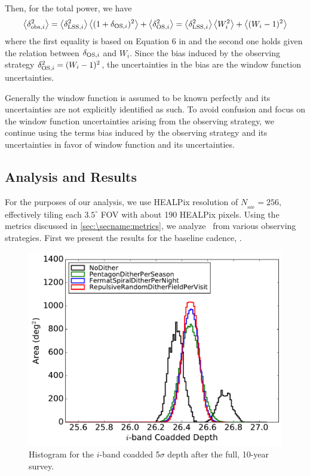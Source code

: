Then, for the total power, we have
\begin{equation}
\left < {\delta_{\mathrm{obs},i}^2} \right >=\left < {\delta_{\mathrm{LSS},i}^2} \right >\left < {(1 + \delta_{\mathrm{OS},i})^2} \right >+ \left < {\delta_{\mathrm{OS},i}^2} \right >=\left < {\delta_{\mathrm{LSS},i}^2} \right >\left < {W_i^2} \right >+ \left < {(W_i-1)^2} \right >
\end{equation}
where the first equality is based on Equation 6 in \citet{AwanEtal2016} and the second one holds given the relation between $\delta_{\mathrm{OS},i}$ and $W_i$. Since the bias induced by the observing strategy $\delta_{\mathrm{OS},i}^2=  (W_i-1)^2$, the uncertainties in the bias are the window function uncertainties.

Generally the window function is assumed to be known perfectly and its uncertainties are not explicitly identified as such. To avoid confusion and focus on the window function uncertainties arising from the observing strategy, we continue using the terms bias induced by the observing strategy and its uncertainties in favor of window function and its uncertainties.

\subsection{\OpSim Analysis and Results}
\label{sec:\secname: analysis}
For the purposes of our analysis, we use HEALPix resolution of $N_\mathrm{_{side}}= 256$, effectively tiling each $3.5^\circ$ FOV with about 190 HEALPix pixels. Using the metrics discussed in \autoref{sec:\secname:metrics}, we analyze \sigmaOS\ from various observing strategies. First we present the results for the baseline cadence, .

\begin{figure}[!htb]
      \centering\hspace*{-3em}\includegraphics[width=0.6\linewidth]{figs/awan_coaddHistogram.pdf}
      \vspace*{-1em}
\caption{Histogram for the $i$-band coadded 5$\sigma$ depth after the full, 10-year survey.}
\label{fig: coaddHistogram}
\end{figure}

